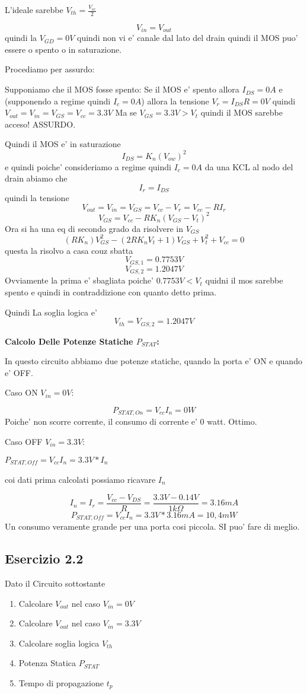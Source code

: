 \documentclass[\main/main.tex]{subfiles}
\begin{document}
L'ideale sarebbe $V_{th} = \frac{V_{cc}}{2}$

\[V_{in} = V_{out}\]
quindi la $V_{GD} = 0V$ quindi non vi e' canale dal lato del drain quindi il MOS puo' essere o spento o in saturazione.

Procediamo per assurdo:

Supponiamo che il MOS fosse spento:
Se il MOS e' spento allora $I_{DS} = 0A$ e (supponendo a regime quindi $I_c = 0A$) allora la tensione $V_r = I_{DS} R = 0V$ quindi $V_{out} = V_{in} = V_{GS} = V_{cc} = 3.3V$
Ma se $V_{GS} = 3.3V > V_t$ quindi il MOS sarebbe acceso!
ASSURDO.

Quindi il MOS e' in saturazione
\[I_{DS} = K_n \left(V_{ow}\right)^2 \]
e quindi poiche' consideriamo a regime quindi $I_c = 0A$
da una KCL al nodo del drain abiamo che
\[I_r = I_{DS} \]
quindi la tensione
\[V_{out} = V_{in} = V_{GS} = V_{cc} - V_r = V_{cc} - R I_r\]
\[V_{GS} = V_{cc} - R K_n \left(V_{GS} - V_t \right)^2\]
Ora si ha una eq di secondo grado da risolvere in $V_{GS}$
\[(R K_n)V_{GS}^2 - (2 R K_n V_t + 1)V_{GS} + V_t^2 + V_{cc} = 0\]
questa la risolvo a casa couz sbatta
\[V_{GS,1} = 0.7753V\]
\[V_{GS,2} = 1.2047V\]
Ovviamente la prima e' sbagliata poiche' $0.7753V < V_t$ quidni il mos sarebbe spento e quindi in contraddizione con quanto detto prima.

Quindi La soglia logica e' \[V_{th} = V_{GS,2} = 1.2047V\]

\textbf{Calcolo Delle Potenze Statiche $P_{STAT}$:}

In questo circuito abbiamo due potenze statiche, quando la porta e' ON e quando e' OFF.

Caso ON $V_{in} = 0V$:

\[P_{STAT,On} = V_{cc} I_{n} = 0W\]
Poiche' non scorre corrente, il consumo di corrente e' 0 watt. Ottimo.


Caso OFF $V_{in} = 3.3V$:

$P_{STAT,Off} = V_{cc} I_{n} = 3.3V * I_{n}$

coi dati prima calcolati possiamo ricavare $I_{n}$

\[I_{n} = I_{r} = \frac{V_{cc} - V_{DS}}{R} = \frac{3.3V - 0.14V}{1k\Omega} = 3.16mA\]
\[P_{STAT,Off} = V_{cc} I_{n} = 3.3V * 3.16mA = 10,4mW\]
Un consumo veramente grande per una porta cosi piccola. SI puo' fare di meglio.

\clearpage
\subsection{Esercizio 2.2}
Dato il Circuito sottostante
\begin{enumerate}
	\item  Calcolare $V_{out}$ nel caso $V_{in} = 0V$
	\item  Calcolare $V_{out}$ nel caso $V_{in} = 3.3V$
	\item  Calcolare soglia logica $V_{th}$
	\item  Potenza Statica $P_{STAT}$
	\item  Tempo di propagazione $t_p$
\end{enumerate}
\end{document}
